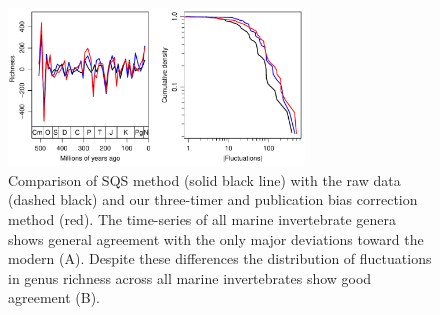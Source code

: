 \documentclass[12pt]{article}
\let\citep=\cite
\begin{document}
\begin{figure}[!hp]
  \centering
  \includegraphics[width=0.7\textwidth]{../../figSupp_divEstComp.pdf}
  \caption[Comparison of SQS method with the raw data and three-timer
  bias correction method]{Comparison of SQS method \citep{alroy2010}
    (solid black line) with the raw data (dashed black) and our
    three-timer and publication bias correction method (red). The
    time-series of all marine invertebrate genera shows general
    agreement with the only major deviations toward the modern
    (A). Despite these differences the distribution of fluctuations in
    genus richness across all marine invertebrates show good
    agreement (B).}
  \label{fig:supp_3TPub}
\end{figure}
\end{document}
